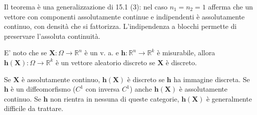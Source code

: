 \documentclass{article}
\begin{document}
Il teorema \`{e} una generalizzazione di 15.1 (3): nel caso $n_{1}=n_{2}=1$
afferma che un vettore con componenti assolutamente continue e indipendenti 
\`{e} assolutamente continuo, con densit\`{a} che si fattorizza.
L'indipendenza a blocchi
permette di preservare l'assoluta continuit\`{a}.

E' noto che se $\mathbf{X}:\Omega \rightarrow 
\mathbb{R}
^{n}$ \`{e} un v. a. e $\mathbf{h}:%
\mathbb{R}
^{n}\rightarrow 
\mathbb{R}
^{k}$ \`{e} misurabile, allora $\mathbf{h}\left( \mathbf{X}\right) :\Omega
\rightarrow 
\mathbb{R}
^{k}$ \`{e} un vettore aleatorio discreto se $\mathbf{X}$ \`{e} discreto.

Se $\mathbf{X}$ \`{e} assolutamente continuo, $\mathbf{h}\left( \mathbf{X}%
\right) $ \`{e} discreto se $\mathbf{h}$ ha immagine discreta. Se $\mathbf{h}
$ \`{e} un diffeomorfismo ($C^{1}$ con inversa $C^{1}$) anche $\mathbf{h}%
\left( \mathbf{X}\right) $ \`{e} assolutamente continuo. Se $\mathbf{h%
}$ non rientra in nessuna di queste categorie, $\mathbf{h}\left( \mathbf{X}%
\right) $ \`{e} generalmente difficile da trattare.
\end{document}
